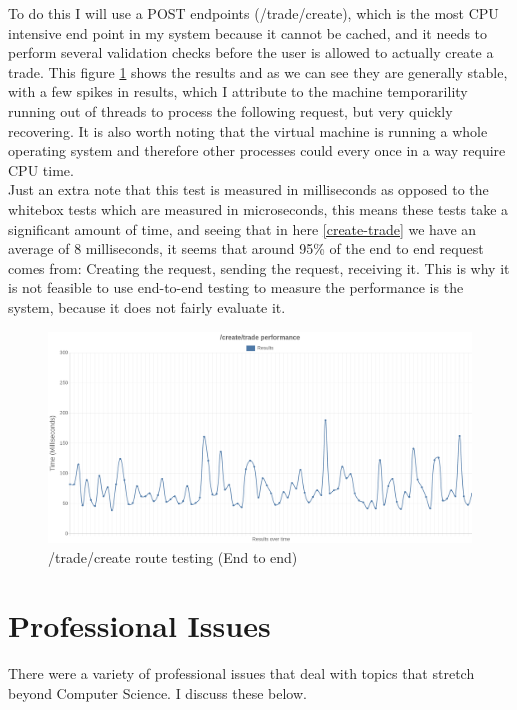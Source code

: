 \documentclass[titlepage]{article}
\begin{document}
To do this I will use a POST endpoints (/trade/create), which is the most CPU intensive end point in my system because it cannot be cached, and it needs to perform several validation checks before the user is allowed to actually create a trade. This figure \ref{e2e_route} shows the results and as we can see they are generally stable, with a few spikes in results, which I attribute to the machine temporarility  running out of threads to process the following request, but very quickly recovering. It is also worth noting that the virtual machine is running a whole operating system and therefore other processes could every once in a way require CPU time. \\

Just an extra note that this test is measured in milliseconds as opposed to the whitebox tests which are measured in microseconds, this means these tests take a significant amount of time, and seeing that in here \ref{create-trade} we have an average of 8 milliseconds, it seems that around 95\% of the end to end request comes from: Creating the request, sending the request, receiving it. This is why it is not feasible to use end-to-end testing to measure the performance is the system, because it does not fairly evaluate it.

\begin{figure}[h!]
\includegraphics[width=\textwidth]{../results/e2e-createtrade.png}
  \caption{/trade/create route testing (End to end)}
  \label{e2e_route}
\end{figure}

\pagebreak
\section{Professional Issues}
There were a variety of professional issues that deal with topics that stretch beyond Computer Science. I discuss these below.
\end{document}
